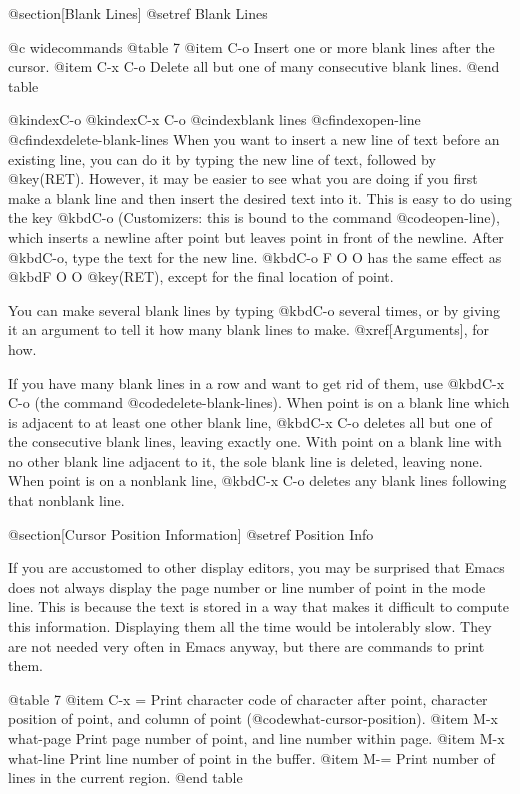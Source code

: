 {{{{@section[Blank Lines]
@setref Blank Lines

@c widecommands
@table 7
@item C-o
Insert one or more blank lines after the cursor.
@item C-x C-o
Delete all but one of many consecutive blank lines.
@end table

@kindex{C-o}
@kindex{C-x C-o}
@cindex{blank lines}
@cfindex{open-line}
@cfindex{delete-blank-lines}
  When you want to insert a new line of text before an existing line, you
can do it by typing the new line of text, followed by @key(RET).
However, it may be easier to see what you are doing if you first make a
blank line and then insert the desired text into it.  This is easy to do
using the key @kbd{C-o} (Customizers: this is bound to the command
@code{open-line}), which inserts a newline after point but leaves point in
front of the newline.  After @kbd{C-o}, type the text for the new line.
@kbd{C-o F O O} has the same effect as @kbd{F O O @key(RET)}, except for
the final location of point.

  You can make several blank lines by typing @kbd{C-o} several times, or by
giving it an argument to tell it how many blank lines to make.
@xref[Arguments], for how.

  If you have many blank lines in a row and want to get rid of them, use
@kbd{C-x C-o} (the command @code{delete-blank-lines}).  When point is on a
blank line which is adjacent to at least one other blank line, @kbd{C-x
C-o} deletes all but one of the consecutive blank lines, leaving exactly
one.  With point on a blank line with no other blank line adjacent to it,
the sole blank line is deleted, leaving none.  When point is on a nonblank
line, @kbd{C-x C-o} deletes any blank lines following that nonblank line.

@section[Cursor Position Information]
@setref Position Info

  If you are accustomed to other display editors, you may be surprised that
Emacs does not always display the page number or line number of point in
the mode line.  This is because the text is stored in a way that makes it
difficult to compute this information.  Displaying them all the time would
be intolerably slow.  They are not needed very often in Emacs anyway,
but there are commands to print them.

@table 7
@item C-x =
Print character code of character after point, character position of point,
and column of point (@code{what-cursor-position}).
@item M-x what-page
Print page number of point, and line number within page.
@item M-x what-line
Print line number of point in the buffer.
@item M-=
Print number of lines in the current region.
@end table

}}}}

